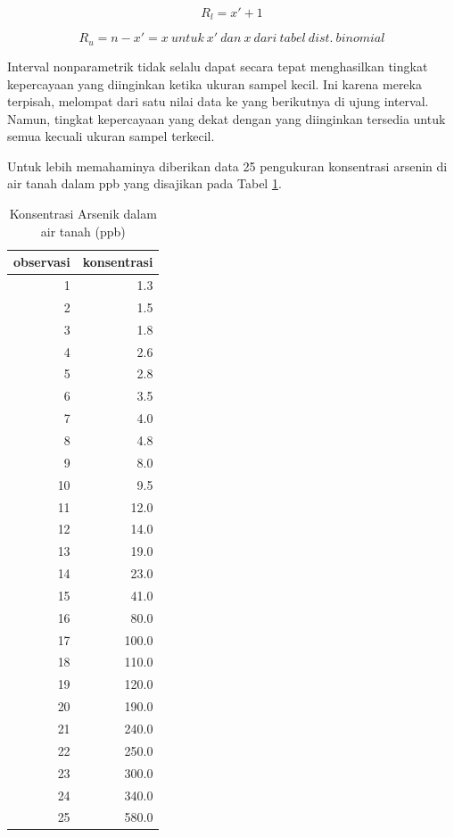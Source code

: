 \documentclass[]{book}
\begin{document}
\begin{equation}
  R_l=x'+1 
  \label{eq:rl}
\end{equation}

\begin{equation}
  R_u=n-x'=x\ untuk\ x'\ dan\ x\ dari\ tabel\ dist.\ binomial 
  \label{eq:ru}
\end{equation}

Interval nonparametrik tidak selalu dapat secara tepat menghasilkan
tingkat kepercayaan yang diinginkan ketika ukuran sampel kecil. Ini
karena mereka terpisah, melompat dari satu nilai data ke yang berikutnya
di ujung interval. Namun, tingkat kepercayaan yang dekat dengan yang
diinginkan tersedia untuk semua kecuali ukuran sampel terkecil.

Untuk lebih memahaminya diberikan data 25 pengukuran konsentrasi arsenin
di air tanah dalam ppb yang disajikan pada Tabel \ref{tab:gwardat}.

\begin{table}[t]

\caption{\label{tab:gwardat}Konsentrasi Arsenik dalam air tanah (ppb)}
\centering
\begin{tabular}{r|r}
\hline
observasi & konsentrasi\\
\hline
1 & 1.3\\
\hline
2 & 1.5\\
\hline
3 & 1.8\\
\hline
4 & 2.6\\
\hline
5 & 2.8\\
\hline
6 & 3.5\\
\hline
7 & 4.0\\
\hline
8 & 4.8\\
\hline
9 & 8.0\\
\hline
10 & 9.5\\
\hline
11 & 12.0\\
\hline
12 & 14.0\\
\hline
13 & 19.0\\
\hline
14 & 23.0\\
\hline
15 & 41.0\\
\hline
16 & 80.0\\
\hline
17 & 100.0\\
\hline
18 & 110.0\\
\hline
19 & 120.0\\
\hline
20 & 190.0\\
\hline
21 & 240.0\\
\hline
22 & 250.0\\
\hline
23 & 300.0\\
\hline
24 & 340.0\\
\hline
25 & 580.0\\
\hline
\end{tabular}
\end{table}
\end{document}
